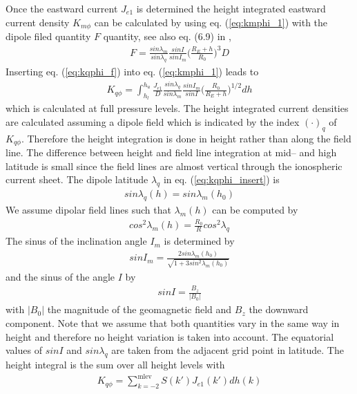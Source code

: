 Once the eastward current $J_{e1}$ is determined the height integrated
eastward current density $K_{m \phi}$ can be calculated by using eq. (\ref{eq:kmphi_1})
with the dipole filed quantity
 $F$ quantity, see also eq. (6.9) in \cite{rich95},
%
\begin{align}
  F = \frac{sin \lambda_m}{sin \lambda_q}\frac{sin I}{sin I_m}\bigl(\frac{R_E+h}{R_0}\bigr)^3 D
  \label{eq:kqphi_f} 
\end{align}
% 
Inserting eq. (\ref{eq:kqphi_f}) into eq. (\ref{eq:kmphi_1}) leads to
%
\begin{align}
 K_{q \phi} = \int_{h_l}^{h_u} \frac{J_{e1}}{D} 
 \frac{sin \lambda_q}{sin \lambda_m}\frac{sin I_m}{sin I}\bigl(\frac{R_0}{R_E+h}\bigr)^{1/2} dh
  \label{eq:kqphi_insert} 
\end{align}
% 
which is calculated at full pressure levels. The height integrated current densities are
calculated assuming a dipole field which is indicated by the index $(\cdot)_q$ of
$K_{q \phi}$. Therefore the height integration is done in height rather than along
the field line. The difference between height and field line integration at mid--
and high latitude is small since the field lines are almost vertical through
the ionospheric current sheet. 
The dipole latitude $\lambda_q$ in 
eq. (\ref{eq:kqphi_insert}) is
%
\begin{align}
 sin \lambda_q (h) = sin \lambda_m (h_0)
\end{align}
% 
We assume dipolar field lines such that $\lambda_m (h)$ can be computed by
%
\begin{align}
 cos^2 \lambda_m (h) = \frac{R_0}{R} cos^2 \lambda_q
\end{align}
% 
The sinus of the inclination angle $I_m$ is determined by
%
\begin{align}
  sin I_m = \frac{2 sin \lambda_m(h_0)}{\sqrt{1 + 3 sin^2 \lambda_m(h_0)}}
\end{align}
% 
and the sinus of the angle $I$ by
%
\begin{align}
  sin I = \frac{B_z}{|B_0|}
\end{align}
% 
with $|B_0|$ the magnitude of the geomagnetic field and $B_z$
the downward component. Note that we assume that both quantities vary
in the same way in height and therefore no height variation is taken
into account. The equatorial values of $ sin I $ and $sin \lambda_q$
are taken from the adjacent grid point in latitude. The height integral
is the sum over all height levels with
%
\begin{align}
  K_{q \phi} = \sum_{k=-2}^{\text{mlev}} S(k') 
    J_{e1}(k') dh(k) \label{eq:kqphi_total}
\end{align}
